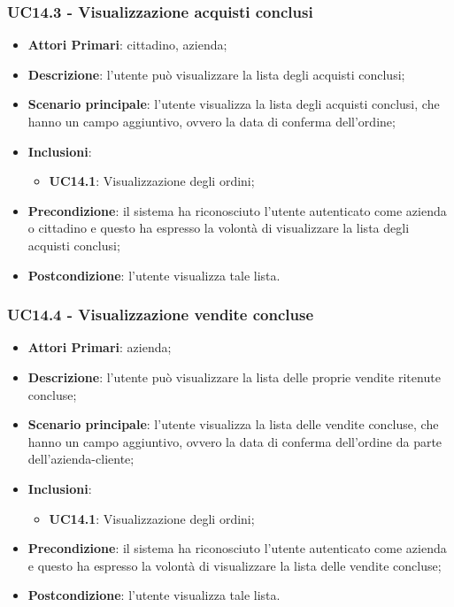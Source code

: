 \subsubsection{UC14.3 - Visualizzazione acquisti conclusi}
\begin{itemize}
	\item \textbf{Attori Primari}: cittadino, azienda;
	\item \textbf{Descrizione}: l'utente può visualizzare la lista degli acquisti conclusi;
	\item \textbf{Scenario principale}: l'utente visualizza la lista degli acquisti conclusi, che hanno un campo aggiuntivo, ovvero la data di conferma dell'ordine;
	\item \textbf{Inclusioni}:
	\begin{itemize}
		\item \textbf{UC14.1}: Visualizzazione degli ordini;
	\end{itemize}
	\item \textbf{Precondizione}: il sistema ha riconosciuto l'utente autenticato come azienda o cittadino e questo ha espresso la volontà di visualizzare la lista degli acquisti conclusi;
	\item \textbf{Postcondizione}: l'utente visualizza tale lista.
\end{itemize}

\subsubsection{UC14.4 - Visualizzazione vendite concluse}
\begin{itemize}
	\item \textbf{Attori Primari}: azienda;
	\item \textbf{Descrizione}: l'utente può visualizzare la lista delle proprie vendite ritenute concluse;
	\item \textbf{Scenario principale}: l'utente visualizza la lista delle vendite concluse, che hanno un campo aggiuntivo, ovvero la data di conferma dell'ordine da parte dell'azienda-cliente;
	\item \textbf{Inclusioni}:
	\begin{itemize}
		\item \textbf{UC14.1}: Visualizzazione degli ordini;
	\end{itemize}
	\item \textbf{Precondizione}: il sistema ha riconosciuto l'utente autenticato come azienda e questo ha espresso la volontà di visualizzare la lista delle vendite concluse;
	\item \textbf{Postcondizione}: l'utente visualizza tale lista.
\end{itemize}


